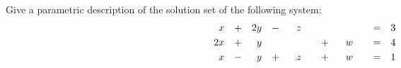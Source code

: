 \documentclass[12pt]{article}
\newenvironment{problem}[2][Problem]
{
	\begin{trivlist} 
		\item[\hskip \labelsep {\bfseries #1 #2:}]
	}
{
	\end{trivlist}
	}
\begin{document}
\newpage
\begin{problem}{4}
Give a parametric description of the solution set of the following system:
\begin{align*}
&&&&&&&&&&&&&&&&&&&&&&&&&&&&&&&& &x&   &+& 2&y& &-&                          &z&                        &\hphantom{500}&  &\hphantom{500}&               &=& &3& &&&&&&&&&&&&&&&&&&&&&&&&&&&&&&&&\\
&&&&&&&&&&&&&&&&&&&&&&&&&&&&&&&& 2&x& &+&  &y&  &\hphantom{500}& &\hphantom{500}& &+&                         &w&                                      &=& &4&  &&&&&&&&&&&&&&&&&&&&&&&&&&&&&&&& \\
&&&&&&&&&&&&&&&&&&&&&&&&&&&&&&&& &x&  &-&   &y&   &+&                         &z&                        &+&                         &w&                                      &=& &1&  &&&&&&&&&&&&&&&&&&&&&&&&&&&&&&&&
\end{align*}


\end{problem}
\end{document}
